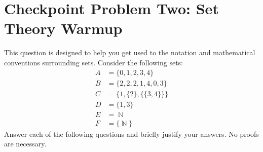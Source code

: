 \documentclass{article}
\renewcommand{\(}{\left(}
\renewcommand{\)}{\right)}
\DeclareMathOperator{\N}{\mathbb{N}}
\theoremstyle{plain}
\theoremstyle{plain}
\theoremstyle{definition}
\begin{document}
\pagebreak

\section*{Checkpoint Problem Two: Set Theory Warmup}

This question is designed to help you get used to the notation and mathematical
conventions surrounding sets.
Consider the following sets:
\begin{align*}
A &= \{0, 1, 2, 3, 4\} \\
B &= \{2, 2, 2, 1, 4, 0, 3\} \\
C &= \{1, \{2\}, \{\{3, 4\}\}\} \\
D &= \{1, 3\} \\
E &= \N \\
F &= \{\N\}
\end{align*}
Answer each of the following questions and briefly justify your answers.
No proofs are necessary.
\end{document}

